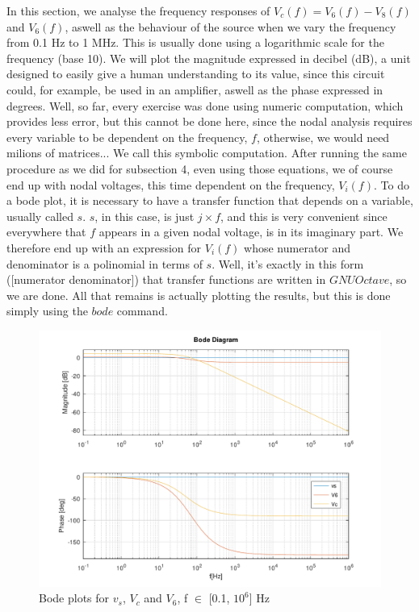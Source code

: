 In this section, we analyse the frequency responses of $V_c(f) = V_6(f) - V_8(f)$ and $V_6(f)$, aswell as the behaviour of the source when we vary the frequency from 0.1 Hz to 1 MHz. This is usually done using a logarithmic scale for the frequency (base 10). We will plot the magnitude expressed in decibel (dB), a unit designed to easily give a human understanding to its value, since this circuit could, for example, be used in an amplifier, aswell as the phase expressed in degrees. Well, so far, every exercise was done using numeric computation, which provides less error, but this cannot be done here, since the nodal analysis requires every variable to be dependent on the frequency, $f$, otherwise, we would need milions of matrices... We call this symbolic computation. After running the same procedure as we did for subsection 4, even using those equations, we of course end up with nodal voltages, this time dependent on the frequency, $V_i(f)$. To do a bode plot, it is necessary to have a transfer function that depends on a variable, usually called $s$. $s$, in this case, is just $j \times f$, and this is very convenient since everywhere that $f$ appears in a given nodal voltage, is in its imaginary part. We therefore end up with an expression for $V_i(f)$ whose numerator and denominator is a polinomial in terms of $s$. Well, it's exactly in this form ([numerator denominator]) that transfer functions are written in $GNUOctave$, so we are done. All that remains is actually plotting the results, but this is done simply using the $bode$ command.

\begin{figure}[h] \centering
\includegraphics[width=0.95\linewidth]{../mat/t2-t6.pdf}
\caption{Bode plots for $v_s$, $V_c$ and $V_6$, f $\in$ [0.1, $10^6$] Hz}
\label{cfergter}
\end{figure}
